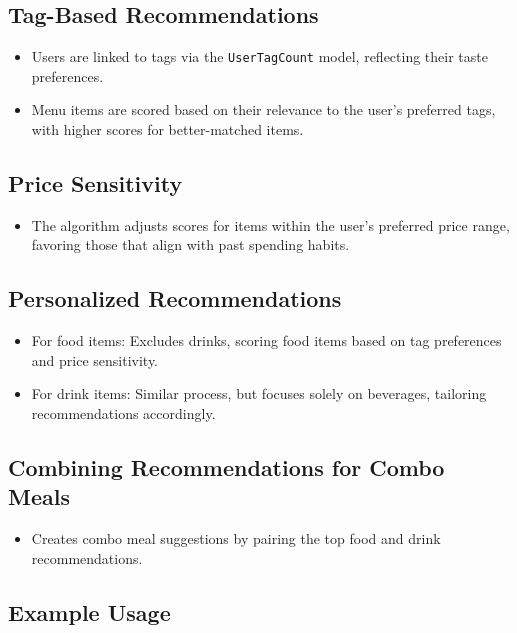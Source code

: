 \subsection{Tag-Based Recommendations}

\begin{itemize}
    \item Users are linked to tags via the \texttt{UserTagCount} model, reflecting their taste preferences.
    \item Menu items are scored based on their relevance to the user's preferred tags, with higher scores for better-matched items.
\end{itemize}

\subsection{Price Sensitivity}

\begin{itemize}
    \item The algorithm adjusts scores for items within the user's preferred price range, favoring those that align with past spending habits.
\end{itemize}

\subsection{Personalized Recommendations}

\begin{itemize}
    \item For food items: Excludes drinks, scoring food items based on tag preferences and price sensitivity.
    \item For drink items: Similar process, but focuses solely on beverages, tailoring recommendations accordingly.
\end{itemize}

\subsection{Combining Recommendations for Combo Meals}

\begin{itemize}
    \item Creates combo meal suggestions by pairing the  top food and drink recommendations.
\end{itemize}

\subsection{Example Usage}
